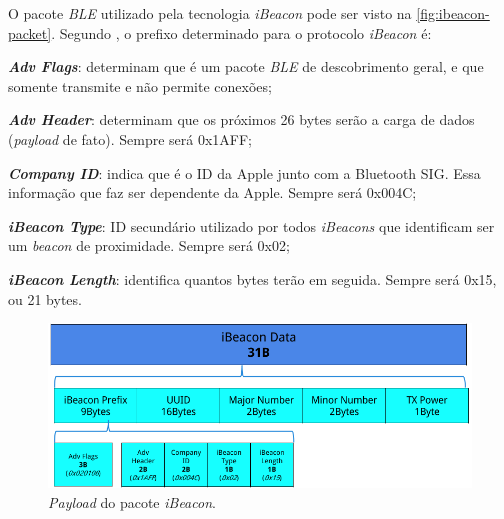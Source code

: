 \begin{table}[htb]
\end{table}

O pacote \textit{BLE} utilizado pela tecnologia \textit{iBeacon} pode ser visto na \autoref{fig:ibeacon-packet}. Segundo , o prefixo determinado para o protocolo \textit{iBeacon} é:

\begin{alineas}
	\item \textit{\textbf{Adv Flags}}: determinam que é um pacote \textit{BLE} de descobrimento geral, e que somente transmite e não permite conexões;
	\item \textit{\textbf{Adv Header}}: determinam que os próximos 26 bytes serão a carga de dados (\textit{payload} de fato). Sempre será 0x1AFF;
	\item \textit{\textbf{Company ID}}: indica que é o ID da Apple junto com a Bluetooth SIG. Essa informação que faz ser dependente da Apple. Sempre será 0x004C;
	\item\textit{\textbf{iBeacon Type}}: ID secundário utilizado por todos \textit{iBeacons} que identificam ser um \textit{beacon} de proximidade. Sempre será 0x02;
	\item\textit{\textbf{iBeacon Length}}: identifica quantos bytes terão em seguida. Sempre será 0x15, ou 21 bytes.
\end{alineas}

\begin{figure}[htb]
	\caption{\label{fig:ibeacon-packet}\textit{Payload} do pacote \textit{iBeacon}.}
	\begin{center}
		\includegraphics[width=1\textwidth]{img/ibeacon-packet.png}
	\end{center}
\end{figure}

